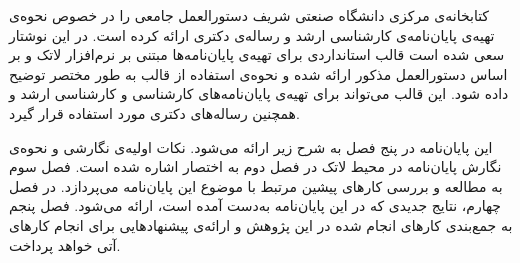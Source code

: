 
کتابخانه‌ی مرکزی دانشگاه صنعتی شریف دستورالعمل جامعی را در خصوص
نحوه‌ی تهیه‌ی پایان‌نامه‌ی کارشناسی ارشد و رساله‌ی دکتری ارائه کرده است.
در این نوشتار سعی شده است قالب استانداردی برای تهیه‌ی پایان‌نامه‌ها مبتنی بر نرم‌افزار لاتک و
بر اساس دستورالعمل مذکور ارائه شده و
نحوه‌ی استفاده از قالب به طور مختصر توضیح داده شود.
این قالب  می‌تواند برای تهیه‌ی پایان‌نامه‌های کارشناسی و کارشناسی ارشد 
و همچنین رساله‌ها‌ی دکتری مورد استفاده قرار گیرد.


این پایان‌نامه در پنج فصل به شرح زیر ارائه می‌شود.
نکات اولیه‌ی نگارشی و نحوه‌ی نگارش پایان‌نامه در محیط لاتک در  فصل دوم به اختصار اشاره شده است. 
فصل سوم به مطالعه و بررسی کارهای پیشین مرتبط با موضوع این پایان‌نامه می‌پردازد.
در فصل چهارم، نتایج جدیدی که در این پایان‌نامه به‌دست آمده است، ارائه می‌شود.
فصل پنجم به جمع‌بندی کارهای انجام شده در این پژوهش و ارائه‌ی پیشنهادهایی برای انجام کارهای آتی خواهد پرداخت.